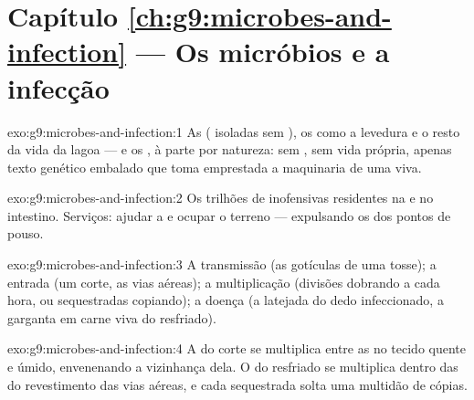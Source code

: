 \section*{Capítulo \ref{ch:g9:microbes-and-infection} --- Os micróbios e a infecção}

\begin{solution}{exo:g9:microbes-and-infection:1}
As  ( isoladas sem ), os 
 como a levedura e o resto da vida  da
lagoa --- e os , à parte por natureza: sem , sem
vida própria, apenas texto genético embalado que toma
emprestada a maquinaria de uma  viva.
\end{solution}

\begin{solution}{exo:g9:microbes-and-infection:2}
Os trilhões de  inofensivas residentes na  e no
intestino. Serviços: ajudar a  e ocupar o terreno ---
expulsando os  dos pontos de pouso.
\end{solution}

\begin{solution}{exo:g9:microbes-and-infection:3}
A transmissão (as gotículas de uma tosse); a entrada (um
corte, as vias aéreas); a multiplicação (divisões dobrando a
cada hora, ou  sequestradas copiando); a doença (a
latejada do dedo infeccionado, a garganta em carne viva do
resfriado).
\end{solution}

\begin{solution}{exo:g9:microbes-and-infection:4}
A  do corte se multiplica entre as  no tecido
quente e úmido, envenenando a vizinhança dela. O  do
resfriado se multiplica dentro das  do revestimento
das vias aéreas, e cada  sequestrada solta uma multidão
de cópias.
\end{solution}

